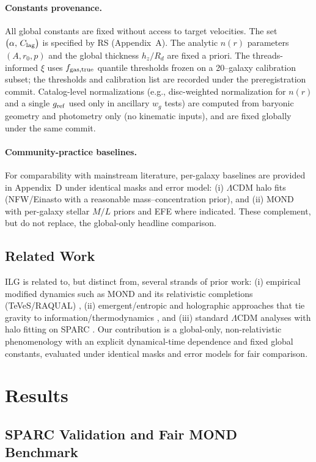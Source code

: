 \documentclass[usenatbib]{mnras}
\begin{document}
\paragraph{Constants provenance.} All global constants are fixed without access to target velocities. The set $\big(\alpha,\,C_{\rm lag}\big)$ is specified by RS (Appendix~A). The analytic $n(r)$ parameters $(A,r_0,p)$ and the global thickness $h_z/R_d$ are fixed a priori. The threads-informed $\xi$ uses $f_{\rm gas,true}$ quantile thresholds frozen on a 20–galaxy calibration subset; the thresholds and calibration list are recorded under the preregistration commit. Catalog-level normalizations (e.g., disc-weighted normalization for $n(r)$ and a single $g_{\rm ref}$ used only in ancillary $w_g$ tests) are computed from baryonic geometry and photometry only (no kinematic inputs), and are fixed globally under the same commit.
\paragraph{Community-practice baselines.} For comparability with mainstream literature, per-galaxy baselines are provided in Appendix~D under identical masks and error model: (i) $\Lambda$CDM halo fits (NFW/Einasto with a reasonable mass–concentration prior), and (ii) MOND with per-galaxy stellar $M/L$ priors and EFE where indicated. These complement, but do not replace, the global-only headline comparison.

\subsection{Related Work}
\noindent ILG is related to, but distinct from, several strands of prior work: (i) empirical modified dynamics such as MOND and its relativistic completions (TeVeS/RAQUAL) \citep{milgrom1983,bekenstein2004,famaey2012}, (ii) emergent/entropic and holographic approaches that tie gravity to information/thermodynamics \citep{verlinde2011,verlinde2017}, and (iii) standard $\Lambda$CDM analyses with halo fitting on SPARC \citep{li2018}. Our contribution is a global-only, non-relativistic phenomenology with an explicit dynamical-time dependence and fixed global constants, evaluated under identical masks and error models for fair comparison.

\section{Results}

\subsection{SPARC Validation and Fair MOND Benchmark}
\end{document}
